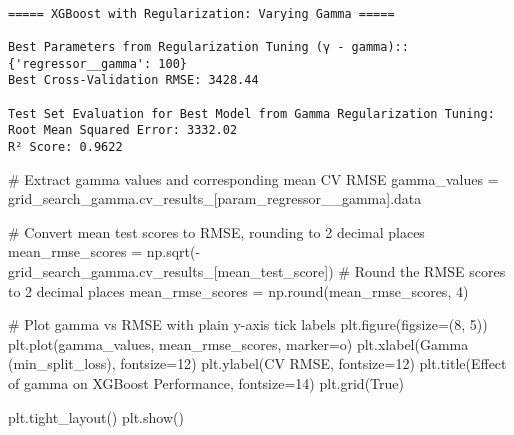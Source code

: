 \documentclass[
  letterpaper,
  DIV=11,
  numbers=noendperiod]{scrreprt}
\newenvironment{Shaded}{\begin{snugshade}}{\end{snugshade}}
\newcommand{\BuiltInTok}[1]{\textcolor[rgb]{0.00,0.23,0.31}{#1}}
\newcommand{\CommentTok}[1]{\textcolor[rgb]{0.37,0.37,0.37}{#1}}
\newcommand{\DecValTok}[1]{\textcolor[rgb]{0.68,0.00,0.00}{#1}}
\newcommand{\NormalTok}[1]{\textcolor[rgb]{0.00,0.23,0.31}{#1}}
\newcommand{\OperatorTok}[1]{\textcolor[rgb]{0.37,0.37,0.37}{#1}}
\newcommand{\StringTok}[1]{\textcolor[rgb]{0.13,0.47,0.30}{#1}}
\newcommand{\VariableTok}[1]{\textcolor[rgb]{0.07,0.07,0.07}{#1}}
\begin{document}
\begin{verbatim}

===== XGBoost with Regularization: Varying Gamma =====

Best Parameters from Regularization Tuning (γ - gamma)::
{'regressor__gamma': 100}
Best Cross-Validation RMSE: 3428.44

Test Set Evaluation for Best Model from Gamma Regularization Tuning:
Root Mean Squared Error: 3332.02
R² Score: 0.9622
\end{verbatim}

\begin{Shaded}
\begin{Highlighting}[]
\CommentTok{\# Extract gamma values and corresponding mean CV RMSE}
\NormalTok{gamma\_values }\OperatorTok{=}\NormalTok{ grid\_search\_gamma.cv\_results\_[}\StringTok{\textquotesingle{}param\_regressor\_\_gamma\textquotesingle{}}\NormalTok{].data}

\CommentTok{\# Convert mean test scores to RMSE, rounding to 2 decimal places}
\NormalTok{mean\_rmse\_scores }\OperatorTok{=}\NormalTok{ np.sqrt(}\OperatorTok{{-}}\NormalTok{grid\_search\_gamma.cv\_results\_[}\StringTok{\textquotesingle{}mean\_test\_score\textquotesingle{}}\NormalTok{])}
\CommentTok{\# Round the RMSE scores to 2 decimal places}
\NormalTok{mean\_rmse\_scores }\OperatorTok{=}\NormalTok{ np.}\BuiltInTok{round}\NormalTok{(mean\_rmse\_scores, }\DecValTok{4}\NormalTok{)}

\CommentTok{\# Plot gamma vs RMSE with plain y{-}axis tick labels}
\NormalTok{plt.figure(figsize}\OperatorTok{=}\NormalTok{(}\DecValTok{8}\NormalTok{, }\DecValTok{5}\NormalTok{))}
\NormalTok{plt.plot(gamma\_values, mean\_rmse\_scores, marker}\OperatorTok{=}\StringTok{\textquotesingle{}o\textquotesingle{}}\NormalTok{)}
\NormalTok{plt.xlabel(}\StringTok{\textquotesingle{}Gamma (min\_split\_loss)\textquotesingle{}}\NormalTok{, fontsize}\OperatorTok{=}\DecValTok{12}\NormalTok{)}
\NormalTok{plt.ylabel(}\StringTok{\textquotesingle{}CV RMSE\textquotesingle{}}\NormalTok{, fontsize}\OperatorTok{=}\DecValTok{12}\NormalTok{)}
\NormalTok{plt.title(}\StringTok{\textquotesingle{}Effect of gamma on XGBoost Performance\textquotesingle{}}\NormalTok{, fontsize}\OperatorTok{=}\DecValTok{14}\NormalTok{)}
\NormalTok{plt.grid(}\VariableTok{True}\NormalTok{)}

\NormalTok{plt.tight\_layout()}
\NormalTok{plt.show()}
\end{Highlighting}
\end{Shaded}
\end{document}
